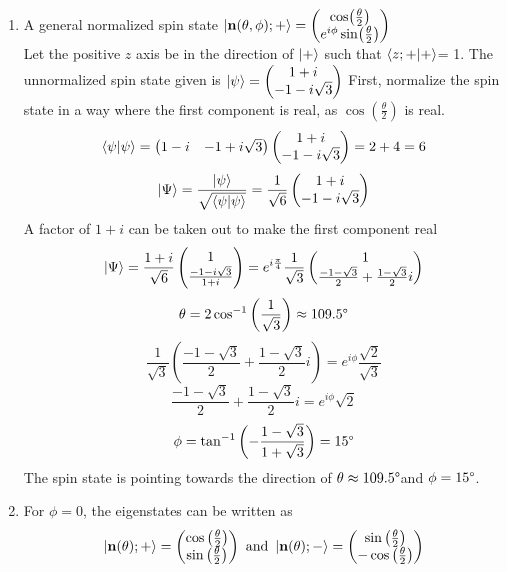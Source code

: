 \begin{sol}
    \begin{enumerate}[label=\textbf{(\alph*)}]
    \item
    A general normalized spin state $\ket{\mathbf{n}(\theta,\phi);+}=\begin{pmatrix}\cos(\frac{\theta}{2})\\e^{i\phi}\sin(\frac{\theta}{2})\end{pmatrix}$\\
    Let the positive $z$ axis be in the direction of $\ket{+}$ such that $\braket{z;+}{+}$= 1. The unnormalized spin state given is $\ket{\psi}=\begin{pmatrix}1+i\\-1-i\sqrt{3}\end{pmatrix}$ 
    First, normalize the spin state in a way where the first component is real, as $\cos(\frac{\theta}{2})$ is real.
    $$\braket{\psi}{\psi}=\begin{pmatrix}1-i & -1+i\sqrt{3}\end{pmatrix}\begin{pmatrix}1+i\\-1-i\sqrt{3}\end{pmatrix}=2+4=6$$
    $$\ket\Psi=\frac{\ket\psi}{\sqrt{\braket{\psi}{\psi}}}=\frac{1}{\sqrt 6}\begin{pmatrix}1+i\\-1-i\sqrt{3}\end{pmatrix}$$
    A factor of $1+i$ can be taken out to make the first component real
    $$\ket\Psi=\frac{1+i}{\sqrt 6}\begin{pmatrix}1\\\frac{-1-i\sqrt 3}{1+i}\end{pmatrix}=e^{i\frac{\pi}{4}}\frac{1}{\sqrt{3}}\begin{pmatrix}1\\\frac{-1-\sqrt{3}}{2}+\frac{1-\sqrt{3}}{2}i\end{pmatrix}$$
    $$\theta=2\cos^{-1}\left(\frac{1}{\sqrt{3}}\right)\approx 109.5\degree$$ 
    $$\frac{1}{\sqrt 3}\left(\frac{-1-\sqrt{3}}{2}+\frac{1-\sqrt{3}}{2}i\right)=e^{i\phi}\frac{\sqrt{2}}{\sqrt{3}}$$
    $$\frac{-1-\sqrt{3}}{2}+\frac{1-\sqrt{3}}{2}i=e^{i\phi}\sqrt{2}$$ 
    $$\phi=\tan^{-1}\left(-\frac{1-\sqrt{3}}{1+\sqrt{3}}\right)=15\degree$$ 
    The spin state is pointing towards the direction of $\theta\approx 109.5\degree$and $\phi=15\degree$.
    \item
    For $\phi=0$, the eigenstates can be written as
    $$\ket{\mathbf{n}(\theta);+}=\begin{pmatrix}\cos\left(\frac{\theta}{2}\right)\\\sin\left(\frac{\theta}{2}\right)\end{pmatrix} \text{ and }\ket{\mathbf{n}(\theta);-}=\begin{pmatrix}\sin\left(\frac{\theta}{2}\right)\\-\cos\left(\frac{\theta}{2}\right)\end{pmatrix}$$  

\end{enumerate}
\end{sol}

